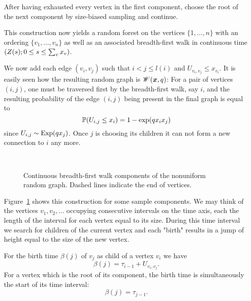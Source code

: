 After having exhausted every vertex in the first component, 
choose the root of the next component by size-biased sampling and continue.

This construction now yields a random forest on the vertices $\{1,  \dots, n\}$
with an ordering $\{v_1, \dots, v_n\}$ 
as well as an associated breadth-first walk in continuous time $(Z(s); 0 \leq s \leq \sum_vx_v)$.

We now add each edge $(v_i, v_j)$ such that $i < j \leq l(i)$ and $U_{v_i, v_j} \leq x_{v_i}$.
It is easily seen how the resulting random graph is $\mathscr{W}(\boldsymbol{x}, q)$:
For a pair of vertices $(i, j)$, one must be traversed first by the breadth-first walk, say $i$,
and the resulting probability of the edge $(i,j)$ being present in the final graph is equal to
\begin{equation}
	\mathbb{P}(U_{i,j} \leq x_i ) = 1 - \exp(q x_i x_j)
\end{equation}
since $U_{i,j} \sim \operatorname*{Exp}(qx_j)$.
Once $j$ is choosing its children it can not form a new connection to $i$ any more.

\begin{figure}[H]
	\centering
	\\
	
	\centering
	
	\caption{Continuous breadth-first walk components of the nonuniform random graph. Dashed lines indicate the end of vertices.}
	\label{F: nonu bf-walk}
\end{figure} 

Figure~\ref{F: nonu bf-walk} shows this construction for some sample components. 
We may think of the vertices $v_1, v_2, \dots$ occupying consecutive intervals on the time axis,
each the length of the interval for each vertex equal to its size.
During this time interval we search for children of the current vertex 
and each "birth" results in a jump of height equal to the size of the new vertex.

For the birth time $\beta(j)$ of $v_j$ as child of a vertex $v_i$ we have
\begin{equation}
	\beta(j) = \tau_{i-1} + U_{v_i, v_j}.
\end{equation}
For a vertex which is the root of its component, the birth time is simultaneously the start of its time interval:
\begin{equation}
	\beta(j) = \tau_{j-1}.
\end{equation}





